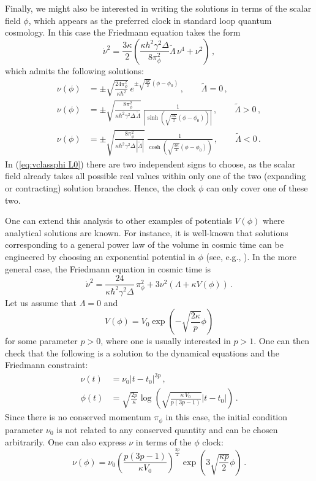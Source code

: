 \documentclass[aps,prd,11pt,showkeys,nofootinbib]{revtex4-2}
\begin{document}
Finally, we might also be interested in writing the solutions in terms of the scalar field $\phi$, which appears as the preferred clock in standard loop quantum cosmology. In this case the Friedmann equation takes the form
\begin{equation}
 \dot \nu^2 =\frac{3\kappa}{2}\left( \frac{\kappa h^2 \gamma^2\Delta}{8\pi_\phi^2} \tilde\Lambda\,\nu^4+\nu^2\right)\,,
\end{equation}
which admits the following solutions:
\begin{align}
    \nu(\phi) &= \pm \sqrt{\frac{24\pi_\phi^2}{\kappa\hbar^2}}\,e^{\pm\sqrt{\frac{3\kappa}{2}}(\phi-\phi_0)}\,,\qquad \tilde\Lambda = 0\,,\label{eq:vclassphi L0}\\
    \nu(\phi) &= \pm \sqrt{\frac{8\pi_\phi^2}{\kappa\hbar^2\gamma^2\Delta\,\tilde\Lambda}}\ \frac{1}{\left\vert\sinh\left(\sqrt{\frac{3\kappa}{2}}(\phi-\phi_0)\right)\right\vert}\,,\qquad \tilde{\Lambda}>0\,,\label{eq:vclassphi Lpos}\\
    \nu(\phi) &= \pm \sqrt{\frac{8\pi_\phi^2}{\kappa\hbar^2\gamma^2\Delta\,|\tilde\Lambda|}}\ \frac{1}{\cosh\left(\sqrt{\frac{3\kappa}{2}}(\phi-\phi_0)\right)}\,,\qquad \tilde{\Lambda}<0\,.\label{eq:vclassphi Lneg}
\end{align}
In (\ref{eq:vclassphi L0}) there are two independent signs to choose, as the scalar field already takes all possible real values within only one of the two (expanding or contracting) solution branches. Hence, the clock $\phi$ can only cover one of these two.


One can extend this analysis to other examples of potentials $V(\phi)$ where analytical solutions are known. For instance, it is well-known that solutions corresponding to a general power law of the volume in cosmic time can be engineered by choosing an exponential potential in $\phi$ (see, e.g., \cite{Ratra:1987rm}). In the more general case, the Friedmann equation in cosmic time is
\begin{equation}
    \dot \nu^2 = \frac{24}{\kappa\hbar^2\gamma^2\Delta}\,\pi_\phi^2 +3\nu^2\left(\Lambda+\kappa V(\phi)\right)\,.
\end{equation}
Let us assume that $\Lambda=0$ and 
\begin{equation}
V(\phi)=V_0\exp\left(-\sqrt{\frac{2\kappa}{p}}\phi\right)
\end{equation}
for some parameter $p>0$, where one is usually interested in $p>1$. One can then check that the following is a solution to the dynamical equations and the Friedmann constraint:
\begin{align}
   \nu(t) &= \nu_0 |t-t_0|^{3p}\,,
 \\ \phi(t) & =  \sqrt{\frac{2p}{\kappa}} \log\left(\sqrt{\frac{\kappa\,V_0}{p(3p-1)}}|t-t_0|\right)\,.
\end{align}
Since there is no conserved momentum $\pi_\phi$ in this case, the initial condition parameter $\nu_0$ is not related to any conserved quantity and can be chosen arbitrarily. One can also express $\nu$ in terms of the $\phi$ clock:
\begin{equation}
 \nu(\phi) = \nu_0 \left(\frac{p(3p-1)}{\kappa V_0}\right)^{\frac{3p}{2}}\exp\left(3\sqrt{\frac{\kappa p}{2}}\phi\right)\,.
\end{equation}
\end{document}

